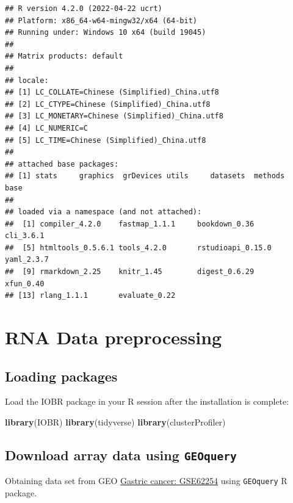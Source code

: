 \documentclass[
  12pt,
]{book}
\newenvironment{Shaded}{\begin{snugshade}}{\end{snugshade}}
\newcommand{\FunctionTok}[1]{\textcolor[rgb]{0.13,0.29,0.53}{\textbf{#1}}}
\newcommand{\NormalTok}[1]{#1}
\begin{document}
\begin{verbatim}
## R version 4.2.0 (2022-04-22 ucrt)
## Platform: x86_64-w64-mingw32/x64 (64-bit)
## Running under: Windows 10 x64 (build 19045)
## 
## Matrix products: default
## 
## locale:
## [1] LC_COLLATE=Chinese (Simplified)_China.utf8 
## [2] LC_CTYPE=Chinese (Simplified)_China.utf8   
## [3] LC_MONETARY=Chinese (Simplified)_China.utf8
## [4] LC_NUMERIC=C                               
## [5] LC_TIME=Chinese (Simplified)_China.utf8    
## 
## attached base packages:
## [1] stats     graphics  grDevices utils     datasets  methods   base     
## 
## loaded via a namespace (and not attached):
##  [1] compiler_4.2.0    fastmap_1.1.1     bookdown_0.36     cli_3.6.1        
##  [5] htmltools_0.5.6.1 tools_4.2.0       rstudioapi_0.15.0 yaml_2.3.7       
##  [9] rmarkdown_2.25    knitr_1.45        digest_0.6.29     xfun_0.40        
## [13] rlang_1.1.1       evaluate_0.22
\end{verbatim}

\hypertarget{rna-data-preprocessing}{%
\chapter{\texorpdfstring{\textbf{RNA Data preprocessing}}{RNA Data preprocessing}}\label{rna-data-preprocessing}}

\hypertarget{loading-packages}{%
\section{Loading packages}\label{loading-packages}}

Load the IOBR package in your R session after the installation is complete:

\begin{Shaded}
\begin{Highlighting}[]
\FunctionTok{library}\NormalTok{(IOBR)}
\FunctionTok{library}\NormalTok{(tidyverse)}
\FunctionTok{library}\NormalTok{(clusterProfiler)}
\end{Highlighting}
\end{Shaded}

\hypertarget{download-array-data-using-geoquery}{%
\section{\texorpdfstring{Download array data using \texttt{GEOquery}}{Download array data using GEOquery}}\label{download-array-data-using-geoquery}}

Obtaining data set from GEO \href{https://pubmed.ncbi.nlm.nih.gov/25894828/}{Gastric cancer: GSE62254} using \texttt{GEOquery} R package.
\end{document}
